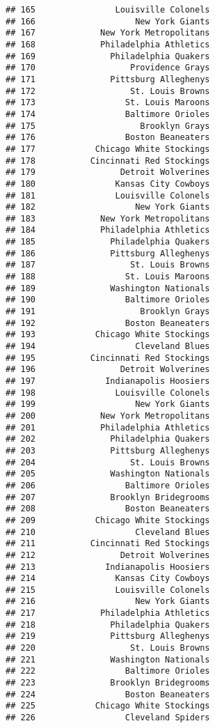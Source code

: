 \documentclass[]{article}
\begin{document}
\begin{verbatim}
## 165                Louisville Colonels
## 166                    New York Giants
## 167             New York Metropolitans
## 168             Philadelphia Athletics
## 169               Philadelphia Quakers
## 170                   Providence Grays
## 171               Pittsburg Alleghenys
## 172                   St. Louis Browns
## 173                  St. Louis Maroons
## 174                  Baltimore Orioles
## 175                     Brooklyn Grays
## 176                  Boston Beaneaters
## 177            Chicago White Stockings
## 178           Cincinnati Red Stockings
## 179                 Detroit Wolverines
## 180                Kansas City Cowboys
## 181                Louisville Colonels
## 182                    New York Giants
## 183             New York Metropolitans
## 184             Philadelphia Athletics
## 185               Philadelphia Quakers
## 186               Pittsburg Alleghenys
## 187                   St. Louis Browns
## 188                  St. Louis Maroons
## 189               Washington Nationals
## 190                  Baltimore Orioles
## 191                     Brooklyn Grays
## 192                  Boston Beaneaters
## 193            Chicago White Stockings
## 194                    Cleveland Blues
## 195           Cincinnati Red Stockings
## 196                 Detroit Wolverines
## 197              Indianapolis Hoosiers
## 198                Louisville Colonels
## 199                    New York Giants
## 200             New York Metropolitans
## 201             Philadelphia Athletics
## 202               Philadelphia Quakers
## 203               Pittsburg Alleghenys
## 204                   St. Louis Browns
## 205               Washington Nationals
## 206                  Baltimore Orioles
## 207               Brooklyn Bridegrooms
## 208                  Boston Beaneaters
## 209            Chicago White Stockings
## 210                    Cleveland Blues
## 211           Cincinnati Red Stockings
## 212                 Detroit Wolverines
## 213              Indianapolis Hoosiers
## 214                Kansas City Cowboys
## 215                Louisville Colonels
## 216                    New York Giants
## 217             Philadelphia Athletics
## 218               Philadelphia Quakers
## 219               Pittsburg Alleghenys
## 220                   St. Louis Browns
## 221               Washington Nationals
## 222                  Baltimore Orioles
## 223               Brooklyn Bridegrooms
## 224                  Boston Beaneaters
## 225            Chicago White Stockings
## 226                  Cleveland Spiders

\end{verbatim}
\end{document}
